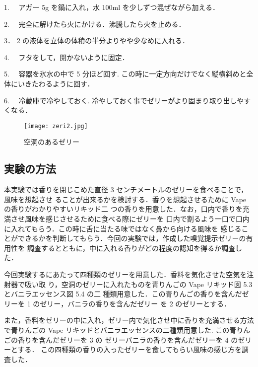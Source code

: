 1. 　アガー 5g を鍋に入れ，水 100ml を少しずつ混ぜながら加える．


2. 　完全に解けたら火にかける．沸騰したら火を止める．


3． 2 の液体を立体の体積の半分よりやや少なめに入れる．


4. 　フタをして，開かないように固定．


5. 　容器を氷水の中で 5 分ほど回す. この時に一定方向だけでなく縦横斜めと全体にいきたわるように回す．


6. 　冷蔵庫で冷やしておく. 冷やしておく事でゼリーがより固まり取り出しやすくなる．


  \begin{figure}[t]
    \centering
    \texttt{[image: zeri2.jpg]}
    \caption{空洞のあるゼリー}
    \label{zeri}
  \end{figure}


\subsection{実験の方法}

本実験では香りを閉じこめた直径 3 センチメートルのゼリーを食べることで，風味を想起させ
ることが出来るかを検討する．香りを想起させるために Vape の香りがわかりやすいリキッド二
つの香りを用意した．なお，口内で香りを充満させ風味を感じさせるために食べる際にゼリーを
口内で割るよう一口で口内に入れてもらう．この時に舌に当たる味ではなく鼻から向ける風味を
感じることができるかを判断してもらう．今回の実験では，作成した嗅覚提示ゼリーの有用性を
調査するとともに，中に入れる香りがどの程度の認知を得るか調査した．


今回実験するにあたって四種類のゼリーを用意した．香料を気化させた空気を注射器で吸い取
り，空洞のゼリーに入れたものを青りんごの Vape リキッド図 5.3 とバニラエッセンス図 5.4 の二
種類用意した．この青りんごの香りを含んだゼリーを 1 のゼリー，バニラの香りを含んだゼリー
を 2 のゼリーとする．


また，香料をゼリーの中に入れ，ゼリー内で気化させ中に香りを充満させる方法で青りんごの
Vape リキッドとバニラエッセンスの二種類用意した. この青りんごの香りを含んだゼリーを 3 の
ゼリーバニラの香りを含んだゼリーを 4 のゼリーとする．
この四種類の香りの入ったゼリーを食してもらい風味の感じ方を調査した．